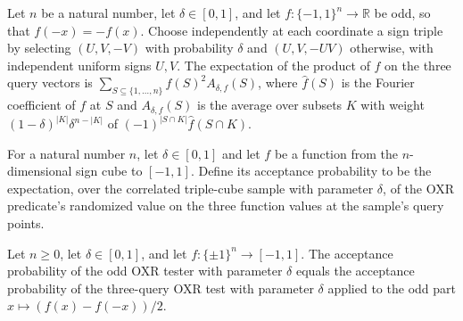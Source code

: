 \begin{theorem}
\label{FABL.pmfExpectation_oxrTripleCubePMF_tripleProduct_eq_randomSubsetAverage}
\leanok
{}
Let $n$ be a natural number, let $\delta\in[0,1]$, and let $f:\{-1,1\}^n\to\mathbb R$ be
odd, so that $f(-x)=-f(x)$. Choose independently at each coordinate a sign triple by
selecting $(U,V,-V)$ with probability $\delta$ and $(U,V,-UV)$ otherwise, with
independent uniform signs $U,V$. The expectation of the product of $f$ on the three
query vectors is $\sum_{S\subseteq\{1,\ldots,n\}}\widehat f(S)^2 A_{\delta,f}(S)$, where
$\widehat f(S)$ is the Fourier coefficient of $f$ at $S$ and $A_{\delta,f}(S)$ is the
average over subsets $K$ with weight $(1-\delta)^{|K|}\delta^{n-|K|}$ of $(-1)^{|S\cap
K|}\widehat f(S\cap K)$.
\end{theorem}

\begin{definition}
\label{FABL.oxrAcceptanceProbability}
\leanok
{}
For a natural number $n$, let $\delta\in[0,1]$ and let $f$ be a function from the
$n$-dimensional sign cube to $[-1,1]$. Define its acceptance probability to be the
expectation, over the correlated triple-cube sample with parameter $\delta$, of the OXR
predicate's randomized value on the three function values at the sample's query points.
\end{definition}

\begin{theorem}
\label{FABL.oxrOddSignTester_acceptanceProbability}
\leanok
{}
Let $n\ge0$, let $\delta\in[0,1]$, and let $f:\{\pm1\}^n\to[-1,1]$. The acceptance
probability of the odd OXR tester with parameter $\delta$ equals the acceptance
probability of the three-query OXR test with parameter $\delta$ applied to the odd part
$x\mapsto(f(x)-f(-x))/2$.
\end{theorem}


